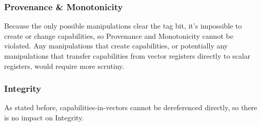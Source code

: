 \subsubsection*{Provenance \& Monotonicity}
Because the only possible manipulations clear the tag bit, it's impossible to create or change capabilities, so Provenance and Monotonicity cannot be violated.
Any manipulations that create capabilities, or potentially any manipulations that transfer capabilities from vector registers directly to scalar registers, would require more scrutiny.

\subsubsection*{Integrity}
As stated before, capabilities-in-vectors cannot be dereferenced directly, so there is no impact on Integrity.
